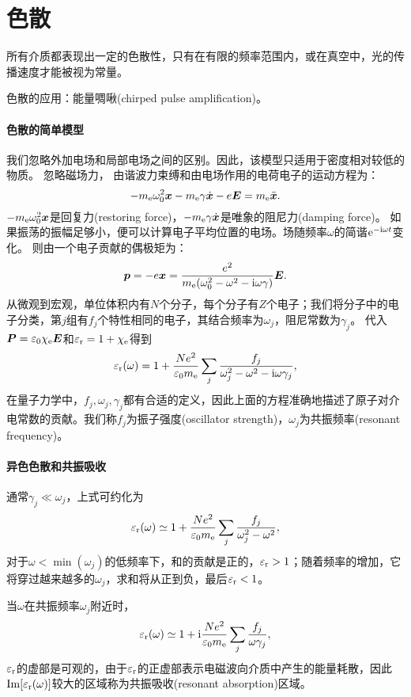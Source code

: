 \section{色散}
所有介质都表现出一定的色散性，只有在有限的频率范围内，或在真空中，光的传播速度才能被视为常量。

色散的应用：能量啁啾(chirped pulse amplification)。
\paragraph{色散的简单模型}
我们忽略外加电场和局部电场之间的区别。因此，该模型只适用于密度相对较低的物质。
忽略磁场力，
由谐波力束缚和由电场作用的电荷电子的运动方程为：
\[
    -m_\mathrm e\omega_0^2\bm x-m_\mathrm e\gamma\dot{\bm x}-e\bm E=m_\mathrm e\ddot{\bm x}.
\]
$-m_\mathrm e\omega_0^2\bm x$是回复力(restoring force)，$-m_\mathrm e\gamma\dot{\bm x}$是唯象的阻尼力(damping force)。
如果振荡的振幅足够小，便可以计算电子平均位置的电场。场随频率$\omega$的简谐$\mathop{}\!\mathrm{e}^{-\mathrm{i}\omega t}$变化。
则由一个电子贡献的偶极矩为：
\[
    \bm p=-e\bm x=\frac{e^2}{m_\mathrm e(\omega_0^2-\omega^2-\mathrm{i}\omega\gamma)}\bm E.
\]
从微观到宏观，单位体积内有$N$个分子，每个分子有$Z$个电子；我们将分子中的电子分类，第$j$组有$f_j$个特性相同的电子，其结合频率为$\omega_j$，阻尼常数为$\gamma_j$。
代入$\bm P=\varepsilon_0\chi_\mathrm e\bm E$和$\varepsilon_\text r=1+\chi_\mathrm e$得到
\begin{equation}
    \varepsilon_\text r(\omega)=1+\frac{Ne^2}{\varepsilon_0m_\mathrm e}\sum_j\frac{f_j}{\omega_j^2-\omega^2-\mathrm{i}\omega\gamma_j},
\end{equation}
在量子力学中，$f_j,\omega_j,\gamma_j$都有合适的定义，因此上面的方程准确地描述了原子对介电常数的贡献。我们称$f_j$为振子强度(oscillator strength)，$\omega_j$为共振频率(resonant frequency)。
\paragraph{异色色散和共振吸收}
通常$\gamma_j\ll\omega_j$，上式可约化为
\[
    \varepsilon_\text r(\omega)\simeq 1+\frac{Ne^2}{\varepsilon_0m_\mathrm e}\sum_j\frac{f_j}{\omega_j^2-\omega^2},
\]
对于$\omega<\min(\omega_j)$的低频率下，和的贡献是正的，$\varepsilon_\text r>1$；随着频率的增加，它将穿过越来越多的$\omega_j$，求和将从正到负，最后$\varepsilon_\text r<1$。

当$\omega$在共振频率$\omega_j$附近时，
\[
    \varepsilon_\text r(\omega)\simeq 1+\mathrm{i}\frac{Ne^2}{\varepsilon_0m_\mathrm e}\sum_j\frac{f_j}{\omega\gamma_j},
\]
$\varepsilon_\text r$的虚部是可观的，由于$\varepsilon_\text r$的正虚部表示电磁波向介质中产生的能量耗散，因此$\operatorname{Im}[\varepsilon_\text r(\omega)]$较大的区域称为共振吸收(resonant absorption)区域。

